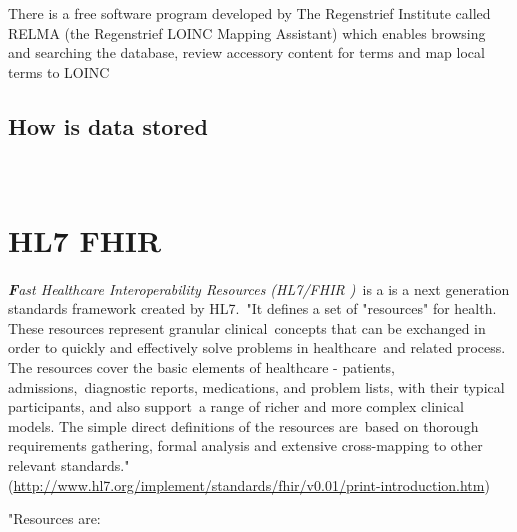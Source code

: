 \documentclass[DIV=calc, paper=a4, fontsize=12pt, onecolumn]{scrartcl}	 %
\newcommand{\initial}[1]{ %
\lettrine[lines=3,lhang=0.3,nindent=0em,slope=0em]{
\color{DarkBlue}
{\textbf{\textit{#1}}}}{}}
\begin{document}
There is a free software program developed by The Regenstrief Institute called RELMA (the Regenstrief LOINC Mapping Assistant) which enables browsing and searching the database, review accessory content for terms and map local terms to LOINC \cite{kroth_using_2012} 

\subsection{How is data stored}\


\section[Fast Healthcare Interoperability Resources (HL7 FHIR\textsuperscript{\texttrademark})]
{HL7 FHIR \textsuperscript{\texttrademark}}
  \label{sec:fhir}

\initial{F}\textit{ast Healthcare Interoperability Resources (HL7/FHIR )}\
is a is a next generation standards framework created by HL7.\
"It defines a set of "resources" for health. These resources represent granular clinical\
concepts that can be exchanged in order to quickly and effectively solve problems in healthcare\
 and related process. The resources cover the basic elements of healthcare - patients, admissions,\
diagnostic reports, medications, and problem lists, with their typical participants, and also support\
a range of richer and more complex clinical models. The simple direct definitions of the resources are\
 based on thorough requirements gathering, formal analysis and extensive cross-mapping to other relevant standards."\\
  (\url{http://www.hl7.org/implement/standards/fhir/v0.01/print-introduction.htm})

"Resources are:\
\end{document}
